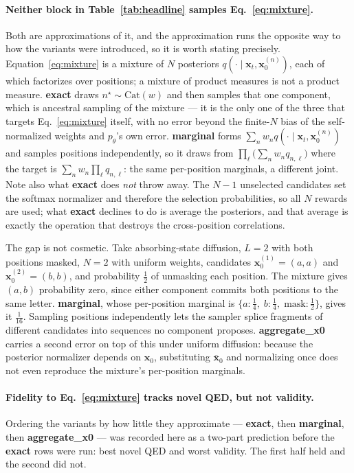 \documentclass[11pt]{article}
\begin{document}
\paragraph{Neither block in Table~\ref{tab:headline} samples
Eq.~\eqref{eq:mixture}.}
Both are approximations of it, and the approximation runs the opposite way to
how the variants were introduced, so it is worth stating precisely.
Equation~\eqref{eq:mixture} is a mixture of $N$ posteriors
$q(\cdot \mid \mathbf{x}_t, \mathbf{x}_0^{(n)})$, each of which factorizes over
positions; a mixture of product measures is not a product measure.
\textbf{exact} draws $n^\star \sim \mathrm{Cat}(w)$ and then samples that one
component, which is ancestral sampling of the mixture --- it is the only one of
the three that targets Eq.~\eqref{eq:mixture} itself, with no error beyond the
finite-$N$ bias of the self-normalized weights and $p_\theta$'s own error.
\textbf{marginal} forms $\sum_n w_n q(\cdot \mid \mathbf{x}_t,
\mathbf{x}_0^{(n)})$ and samples positions independently, so it draws from
$\prod_\ell \big(\sum_n w_n q_{n,\ell}\big)$ where the target is
$\sum_n w_n \prod_\ell q_{n,\ell}$: the same per-position marginals, a different
joint. Note also what \textbf{exact} does \emph{not} throw away. The $N - 1$
unselected candidates set the softmax normalizer and therefore the selection
probabilities, so all $N$ rewards are used; what \textbf{exact} declines to do
is average the posteriors, and that average is exactly the operation that
destroys the cross-position correlations.

The gap is not cosmetic. Take absorbing-state diffusion, $L = 2$ with both
positions masked, $N = 2$ with uniform weights, candidates
$\mathbf{x}_0^{(1)} = (a,a)$ and $\mathbf{x}_0^{(2)} = (b,b)$, and probability
$\tfrac12$ of unmasking each position. The mixture gives $(a,b)$ probability
zero, since either component commits both positions to the same letter.
\textbf{marginal}, whose per-position marginal is
$\{a: \tfrac14,\; b: \tfrac14,\; \mathrm{mask}: \tfrac12\}$, gives it
$\tfrac{1}{16}$. Sampling positions independently lets the sampler splice
fragments of different candidates into sequences no component proposes.
\textbf{aggregate\_x0} carries a second error on top of this under uniform
diffusion: because the posterior normalizer depends on $\mathbf{x}_0$,
substituting $\bar{\mathbf{x}}_0$ and normalizing once does not even reproduce
the mixture's per-position marginals.

\paragraph{Fidelity to Eq.~\eqref{eq:mixture} tracks novel QED, but not
validity.}
Ordering the variants by how little they approximate --- \textbf{exact}, then
\textbf{marginal}, then \textbf{aggregate\_x0} --- was recorded here as a
two-part prediction before the \textbf{exact} rows were run: best novel QED and
worst validity. The first half held and the second did not.
\end{document}
